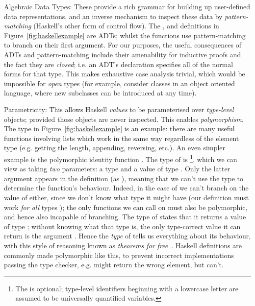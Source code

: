 \begin{description}
\item{Algebraic Data Types}: These provide a rich grammar for building up
  user-defined data representations, and an inverse mechanism to inspect these
  data by \emph{pattern-matching} (Haskell's other form of control flow). The
  ,  and  definitions in
  Figure~\ref{fig:haskellexample} are ADTs; whilst the functions use
  pattern-matching to branch on their first argument. For our purposes, the
  useful consequences of ADTs and pattern-matching include their amenability for
  inductive proofs and the fact they are \emph{closed}; i.e. an ADT's
  declaration specifies all of the normal forms for that type. This makes
  exhaustive case analysis trivial, which would be impossible for \emph{open}
  types (for example, consider classes in an object oriented language, where new
  subclasses can be introduced at any time).

\item{Parametricity}: This allows Haskell \emph{values} to be parameterised over
  \emph{type-level} objects; provided those objects are never inspected. This
  enables \emph{polymorphism}. The  type in
  Figure~\ref{fig:haskellexample} is an example: there are many useful functions
  involving lists which work in the same way regardless of the element type
  (e.g. getting the length, appending, reversing, etc.). An even simpler example
  is the polymorphic identity function . The type of  is
  \footnote{The  is optional; type-level
    identifiers beginning with a lowercase letter are assumed to be universally
    quantified variables.}, which we can view as taking \emph{two} parameters:
  a type  and a value of type . Only the latter argument appears in
  the definition (as ), meaning that we can't use the type  to
  determine the function's behaviour. Indeed, in the case of  we can't
  branch on the value of  either, since we don't know what type it might
  have (our definition must work \emph{for all} types ); the only
  functions we can call on  must also be polymorphic, and hence also
  incapable of branching. The type of  states that it returns a value of
  type ; without knowing what that type is, the only type-correct value it
  can return is the argument . Hence the \emph{type} of  tells us
  everything about its behaviour, with this style of reasoning known as
  \emph{theorems for free}~\cite{wadler1989theorems}. Haskell definitions are
  commonly made polymorphic like this, to prevent incorrect implementations
  passing the type checker, e.g.  might return the
  wrong element, but  can't.


\end{description}
